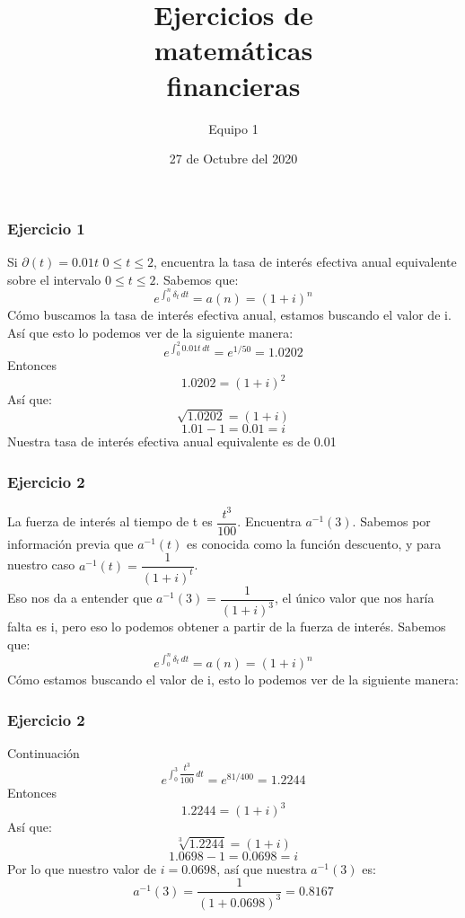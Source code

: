 \documentclass[compress]{beamer}
\title{Ejercicios de \\ matemáticas  \\financieras}
\subtitle{Equipo 1}
\date{27 de Octubre del 2020}
\institute{Universidad Autónoma de Yucatan}
\begin{document}


\begin{frame}
\titlepage
\end{frame}


\begin{frame}\frametitle{Ejercicio 1}
\begin{block}{Si $\partial (t)=0.01t$ $0\leq t \leq 2$, encuentra la tasa de interés efectiva anual equivalente sobre el intervalo $0\leq t \leq 2$.}
Sabemos que:
$$e^{\int_{0}^{n} \delta_{t} \,dt} = a(n) = (1 + i)^{n}$$
Cómo buscamos la tasa de interés efectiva anual, estamos buscando el valor de i. Así que esto lo podemos ver de la siguiente manera:
$$e^{\int_{0}^{2} 0.01t \,dt} = e^{1/50} = 1.0202$$
Entonces
$$1.0202 = (1 + i)^{2}$$
Así que:
$$\sqrt{1.0202} = (1 + i)$$
$$1.01 - 1 = 0.01 = i$$
Nuestra tasa de interés efectiva anual equivalente es de 0.01
\end{block}
\end{frame}

\begin{frame}\frametitle{Ejercicio 2}
\begin{block}{La fuerza de interés al tiempo de t es $\dfrac{t^{3}}{100}$. Encuentra $a^{-1}(3)$.}
Sabemos por información previa que $a^{-1}(t)$ es conocida como la función descuento, y para nuestro caso $a^{-1}(t) = \dfrac{1}{(1 + i)^{t}}$. \\ Eso nos da a entender que $a^{-1}(3) = \dfrac{1}{(1 + i)^{3}}$, el único valor que nos haría falta es i, pero eso lo podemos obtener a partir de la fuerza de interés.
Sabemos que:
$$e^{\int_{0}^{n} \delta_{t} \,dt} = a(n) = (1 + i)^{n}$$
Cómo estamos buscando el valor de i, esto lo podemos ver de la siguiente manera:
\end{block}
\end{frame} 

\begin{frame}\frametitle{Ejercicio 2}
\begin{block}{Continuación}
$$e^{\int_{0}^{3} \dfrac{t^{3}}{100} \,dt} = e^{81/400} = 1.2244$$
Entonces
$$1.2244 = (1 + i)^{3}$$
Así que:
$$\sqrt[3]{1.2244} = (1 + i)$$
$$1.0698 - 1 = 0.0698 = i$$
Por lo que nuestro valor de $i=0.0698$, así que nuestra $a^{-1}(3)$ es:
$$a^{-1}(3) = \dfrac{1}{(1 + 0.0698)^{3}} = 0.8167$$
\end{block}
\end{frame} 
\end{document}
